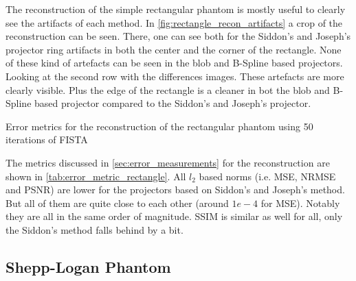 The reconstruction of the simple rectangular phantom is mostly useful to clearly see the artifacts
of each method. In \autoref{fig:rectangle_recon_artifacts} a crop of the reconstruction can be seen.
There, one can see both for the Siddon's and Joseph's projector ring artifacts in both the center
and the corner of the rectangle. None of these kind of artefacts can be seen in the blob and
B-Spline based projectors. Looking at the second row with the differences images. These artefacts
are more clearly visible. Plus the edge of the rectangle is a cleaner in bot the blob and B-Spline
based projector compared to the Siddon's and Joseph's projector.

\begin{table}[h]%
	\centering
	\caption{Error metrics for the reconstruction of the rectangular phantom using 50 iterations
		of FISTA}%
	\label{tab:error_metric_rectangle}
\end{table}

The metrics discussed in \autoref{sec:error_measurements} for the reconstruction are shown in
\autoref{tab:error_metric_rectangle}. All \(l_2\) based norms (i.e. \gls{MSE}, \gls{NRMSE} and
\gls{PSNR}) are lower for the projectors based on Siddon's and Joseph's method. But all of them are
quite close to each other (around \(1e-4\) for \gls{MSE}). Notably they are all in the same order of
magnitude. \gls{SSIM} is similar as well for all, only the Siddon's method falls behind by a bit.

\subsection{Shepp-Logan Phantom}

